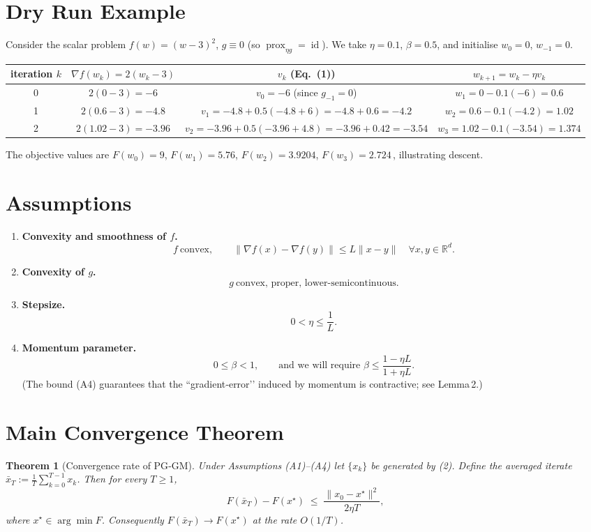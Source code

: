 \documentclass{article}
\newtheorem{theorem}{Theorem}
\newcommand{\prox}{\operatorname{prox}}
\begin{document}
\section*{Dry Run Example}
Consider the scalar problem $f(w)=(w-3)^{2}$, $g\equiv0$ (so $\prox_{\eta g}= \operatorname{id}$).  
We take $\eta=0.1$, $\beta=0.5$, and initialise $w_{0}=0$, $w_{-1}=0$.

\begin{center}
\begin{tabular}{c|c|c|c}
iteration $k$ & $\nabla f(w_k)=2(w_k-3)$ & $v_k$ (Eq.~(1)) & $w_{k+1}=w_k-\eta v_k$ \\ \hline
0 & $2(0-3)=-6$ & $v_0=-6$ (since $g_{-1}=0$) & $w_1=0-0.1(-6)=0.6$ \\
1 & $2(0.6-3)=-4.8$ & $v_1=-4.8+0.5(-4.8+6)=-4.8+0.6=-4.2$ & $w_2=0.6-0.1(-4.2)=1.02$ \\
2 & $2(1.02-3)=-3.96$ & $v_2=-3.96+0.5(-3.96+4.8)=-3.96+0.42=-3.54$ & $w_3=1.02-0.1(-3.54)=1.374$ 
\end{tabular}
\end{center}
The objective values are $F(w_0)=9$, $F(w_1)=5.76$, $F(w_2)=3.9204$, $F(w_3)=2.724\,$, illustrating descent.

\newpage

\section*{Assumptions}
\begin{enumerate}
\item \textbf{Convexity and smoothness of $f$.}  
\[
f\ \text{convex},\qquad \|\nabla f(x)-\nabla f(y)\|\le L\|x-y\|\quad\forall x,y\in\mathbb{R}^{d}.
\tag{A1}
\]

\item \textbf{Convexity of $g$.}  
\[
g\ \text{convex, proper, lower‑semicontinuous}.
\tag{A2}
\]

\item \textbf{Stepsize.}  
\[
0<\eta\le \frac{1}{L}.
\tag{A3}
\]

\item \textbf{Momentum parameter.}  
\[
0\le\beta<1,\qquad\text{and we will require }\beta\le\frac{1-\eta L}{1+\eta L}.
\tag{A4}
\]
(The bound (A4) guarantees that the “gradient‑error’’ induced by momentum is contractive; see Lemma 2.)
\end{enumerate}

\section*{Main Convergence Theorem}
\begin{theorem}[Convergence rate of PG‑GM]\label{thm:main}
Under Assumptions (A1)–(A4) let $\{x_k\}$ be generated by (2).  
Define the averaged iterate $\bar x_T:=\frac{1}{T}\sum_{k=0}^{T-1}x_k$.  
Then for every $T\ge 1$,
\[
F(\bar x_T)-F(x^{\star})\;\le\;\frac{\|x_0-x^{\star}\|^{2}}{2\eta T},
\tag{3}
\]
where $x^{\star}\in\arg\min F$.
Consequently $F(\bar x_T)\to F(x^{\star})$ at the rate $O(1/T)$.
\end{theorem}
\end{document}
